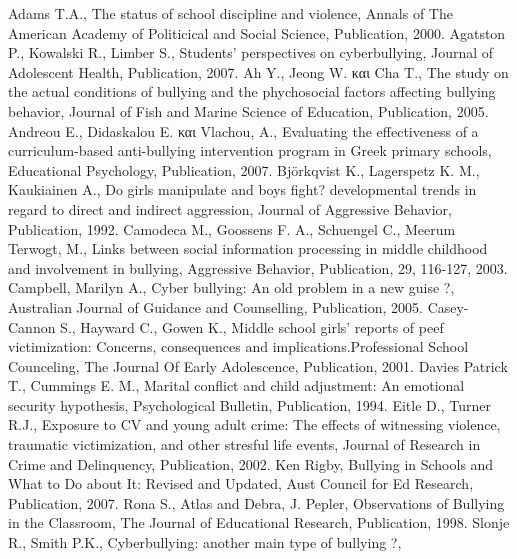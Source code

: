 \documentclass[12pt,a4paper,oneside]{book}
\renewcommand{\headrulewidth}{0pt}
\renewcommand{\headrulewidth}{0pt}
\begin{document}
\begin{thebibliography}{0}
\renewcommand{\headrulewidth}{0pt}
\fancyhead{}
\markboth{}{}{}

Adams T.A., The status of school discipline and
violence, Annals of The American Academy of Politicical and Social
Science, Publication, 2000.
Agatston P., Kowalski R., Limber S., Students’ perspectives on cyberbullying,
Journal of Adolescent Health, Publication, 2007.
Ah Y., Jeong W. και Cha T., The study on the actual conditions of bullying and
the phychosocial factors affecting bullying behavior, Journal of Fish and Marine
Science of Education, Publication, 2005.
Andreou E., Didaskalou E. και Vlachou, A., Evaluating the effectiveness of a
curriculum-based anti-bullying intervention program in Greek primary schools,
Educational Psychology, Publication, 2007.
Björkqvist K., Lagerspetz K. M., Kaukiainen A., Do girls manipulate and boys
fight? developmental trends in regard to direct and indirect aggression, Journal
of  Aggressive Behavior, Publication, 1992.
Camodeca M., Goossens F. A., Schuengel C., Meerum Terwogt, M., Links
between social information processing in middle childhood and involvement in
bullying, Aggressive Behavior, Publication, 29, 116-127, 2003.
Campbell, Marilyn A.,  Cyber bullying: An old problem in a new guise ?,
Australian Journal of Guidance and Counselling, Publication,  2005.
Casey-Cannon S., Hayward C., Gowen K., Middle school girls' reports of peef 
victimization: Concerns, consequences and implications.Professional School
Counceling,  The Journal Of Early Adolescence, Publication, 2001.
Davies Patrick T., Cummings E. M., Marital conflict and child adjustment: An
emotional security hypothesis, Psychological Bulletin, Publication, 1994.
Eitle D., Turner R.J., Exposure to CV and young adult crime: The effects of
 witnessing violence, traumatic victimization, and other stresful life events, Journal of
 Research in Crime and Delinquency, Publication, 2002.
Ken Rigby, Bullying in Schools and What to Do about It: Revised and Updated,
Aust Council for Ed Research, Publication, 2007.
Rona S.,  Atlas and Debra, J. Pepler, Observations of Bullying in the Classroom,
The Journal of Educational Research, Publication, 1998.
Slonje R., Smith P.K., Cyberbullying: another main type of bullying ?,

\end{thebibliography}
\end{document}
